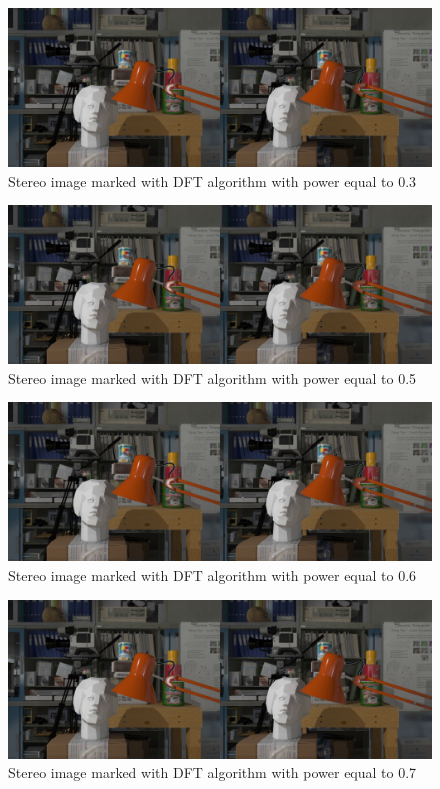 \begin{figure}[h!]
\centering
\includegraphics[width=1\textwidth]{./img/marked_03_DFT.png}
\caption{\small{Stereo image marked with DFT algorithm with power equal to 0.3}}
\label{fig:dft03}
\end{figure}
\begin{figure}[h!]
\centering
\includegraphics[width=1\textwidth]{./img/marked_05_DFT.png}
\caption{\small{Stereo image marked with DFT algorithm with power equal to 0.5}}
\label{fig:dft05}
\end{figure}
\begin{figure}[h!]
\centering
\includegraphics[width=1\textwidth]{./img/marked_06_DFT.png}
\caption{\small{Stereo image marked with DFT algorithm with power equal to 0.6}}
\label{fig:dft06}
\end{figure}
\begin{figure}[h!]
\centering
\includegraphics[width=1\textwidth]{./img/marked_07_DFT.png}
\caption{\small{Stereo image marked with DFT algorithm with power equal to 0.7}}
\label{fig:dft07}
\end{figure}

